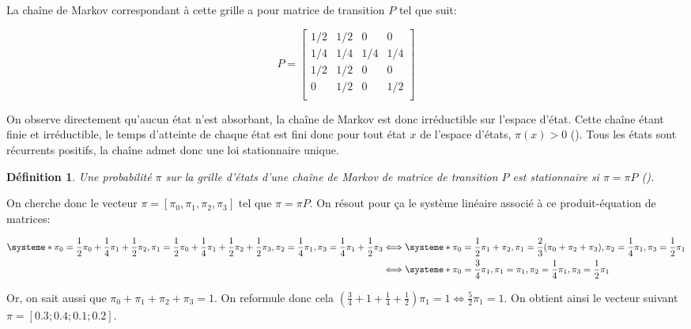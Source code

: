 \documentclass[11pt,a4paper]{article}
\newtheorem*{definition}{Définition}
\begin{document}
La chaîne de Markov correspondant à cette grille a pour matrice de
transition $P$ tel que suit:

\[
P = \begin{bmatrix}
  1/2 & 1/2 & 0 & 0 \\
  1/4 & 1/4 & 1/4 & 1/4 \\
  1/2 & 1/2 & 0 & 0 \\
  0 & 1/2 & 0 & 1/2 \\
\end{bmatrix}
\]

On observe directement qu'aucun état n'est absorbant, la chaîne de
Markov est donc irréductible sur l'espace d'état. Cette chaîne étant
finie et irréductible, le temps d'atteinte de chaque état est fini
donc pour tout état $x$ de l'espace d'états, $\pi(x) > 0$
(\cite{delmas2010}). Tous les états sont récurrents positifs, la
chaîne admet donc une loi stationnaire unique.

\begin{definition}
  Une probabilité $\pi$ sur la grille d'états d'une chaîne de Markov
  de matrice de transition $P$ est stationnaire si $\pi = \pi P$ (\cite{delmas2010}).
\end{definition}

On cherche donc le vecteur $\pi = [\pi_0, \pi_1, \pi_2, \pi_3]$ tel que
$\pi = \pi P$. On résout pour ça le système linéaire associé à ce
produit-équation de matrices:

\begin{equation}
  \begin{split}
    \systeme*{
      \pi_0 = \frac{1}{2}\pi_0 + \frac{1}{4}\pi_1 + \frac{1}{2}\pi_2,
      \pi_1 = \frac{1}{2}\pi_0 + \frac{1}{4}\pi_1 + \frac{1}{2}\pi_2 +
      \frac{1}{2}\pi_3,
      \pi_2 = \frac{1}{4}\pi_1,
      \pi_3 = \frac{1}{4}\pi_1 + \frac{1}{2}\pi_3
    }
    &\Longleftrightarrow
    \systeme*{
      \pi_0 = \frac{1}{2}\pi_1 + \pi_2,
      \pi_1 = \frac{2}{3}(\pi_0 + \pi_2 + \pi_3),
      \pi_2 = \frac{1}{4}\pi_1,
      \pi_3 = \frac{1}{2}\pi_1
    } \\
    &\Longleftrightarrow
    \systeme*{
      \pi_0 = \frac{3}{4}\pi_1,
      \pi_1 = \pi_1,
      \pi_2 = \frac{1}{4}\pi_1,
      \pi_3 = \frac{1}{2}\pi_1
    }
  \end{split}
\end{equation}

Or, on sait aussi que $\pi_0 + \pi_1 + \pi_2 + \pi_3 = 1$. On reformule donc
cela $(\frac{3}{4} + 1 + \frac{1}{4} + \frac{1}{2})\pi_1 = 1
\Longleftrightarrow \frac{5}{2}\pi_1 = 1$. On obtient ainsi le vecteur
suivant $\pi = [0.3; 0.4; 0.1; 0.2]$.
\end{document}
